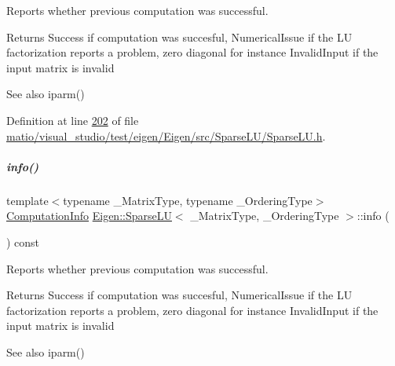 Reports whether previous computation was successful. 

\begin{DoxyReturn}{Returns}
{\ttfamily Success} if computation was succesful, {\ttfamily Numerical\+Issue} if the LU factorization reports a problem, zero diagonal for instance {\ttfamily Invalid\+Input} if the input matrix is invalid
\end{DoxyReturn}
\begin{DoxySeeAlso}{See also}
iparm() 
\end{DoxySeeAlso}


Definition at line \hyperlink{matio_2visual__studio_2test_2eigen_2_eigen_2src_2_sparse_l_u_2_sparse_l_u_8h_source_l00202}{202} of file \hyperlink{matio_2visual__studio_2test_2eigen_2_eigen_2src_2_sparse_l_u_2_sparse_l_u_8h_source}{matio/visual\+\_\+studio/test/eigen/\+Eigen/src/\+Sparse\+L\+U/\+Sparse\+L\+U.\+h}.

\mbox{\label{group___sparse_l_u___module_ab0d0c1744ffd5a1dff578a44bcef2a3d}} 
\subparagraph{\texorpdfstring{info()}{info()}\hspace{0.1cm}{\footnotesize\ttfamily [2/2]}}
{\footnotesize\ttfamily template$<$typename \+\_\+\+Matrix\+Type, typename \+\_\+\+Ordering\+Type$>$ \\
\hyperlink{group__enums_ga85fad7b87587764e5cf6b513a9e0ee5e}{Computation\+Info} \hyperlink{group___sparse_l_u___module_class_eigen_1_1_sparse_l_u}{Eigen\+::\+Sparse\+LU}$<$ \+\_\+\+Matrix\+Type, \+\_\+\+Ordering\+Type $>$\+::info (\begin{DoxyParamCaption}{ }\end{DoxyParamCaption}) const\hspace{0.3cm}{\ttfamily [inline]}}



Reports whether previous computation was successful. 

\begin{DoxyReturn}{Returns}
{\ttfamily Success} if computation was succesful, {\ttfamily Numerical\+Issue} if the LU factorization reports a problem, zero diagonal for instance {\ttfamily Invalid\+Input} if the input matrix is invalid
\end{DoxyReturn}
\begin{DoxySeeAlso}{See also}
iparm() 
\end{DoxySeeAlso}


